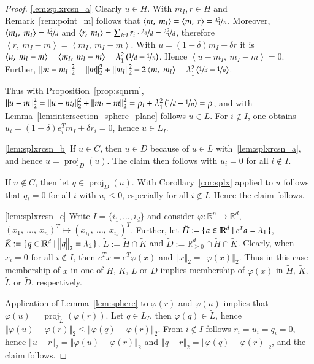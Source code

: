 \documentclass[twoside,11pt]{article}
\DeclareMathOperator{\proj}{proj}
\newcommand{\R}{\mathbb{R}}
\newcommand{\0}{\mathcal{O}}
\newcommand{\transp}{^T}
\newcommand{\norm}[1]{\left\Vert#1\right\Vert}
\newcommand{\scp}[2]{\left<#1,\ #2\right>}
\newcommand{\discint}[2]{\{#1,\dotsc,#2\}}
\begin{document}
\begin{proof}
\ref{lem:splxrcsn_a}
Clearly $u\in H$.
With $m_I,r\in H$ and Remark~\ref{rem:point_m} follows that $\scp{m}{m_I} = \scp{m}{r} = \nicefrac{\lambda_1^2}{n}$.
Moreover, $\scp{m_I}{m_I} = \nicefrac{\lambda_1^2}{d}$ and $\scp{r}{m_I} = \sum_{i\in I}r_i\cdot\nicefrac{\lambda_1}{d} = \nicefrac{\lambda_1^2}{d}$, therefore $\scp{r}{m_I - m} = \scp{m_I}{m_I - m}$.
With $u = \left(1 - \delta\right)m_I + \delta r$ it is $\scp{u}{m_I - m} = \scp{m_I}{m_I - m} = \lambda_1^2\left(\nicefrac{1}{d} - \nicefrac{1}{n}\right)$.
Hence $\scp{u - m_I}{m_I - m} = 0$.
Further, $\norm{m - m_I}_2^2 = \norm{m}_2^2 + \norm{m_I}_2^2 - 2\scp{m}{m_I} = \lambda_1^2\left(\nicefrac{1}{d} - \nicefrac{1}{n}\right)$.

Thus with Proposition~\ref{prop:sqnrm}, $\norm{u - m}_2^2 = \norm{u - m_I}_2^2 + \norm{m_I - m}_2^2 = \rho_I + \lambda_1^2\left(\nicefrac{1}{d} - \nicefrac{1}{n}\right) = \rho$, and with Lemma~\ref{lem:intersection_sphere_plane} follows $u\in L$.
For $i\not\in I$, one obtains $u_i = \left(1 - \delta\right)e_i\transp m_I + \delta r_i = 0$, hence $u\in L_I$.

\ref{lem:splxrcsn_b}
If $u\in C$, then $u\in D$ because of $u\in L$ with~\ref{lem:splxrcsn_a}, and hence $u = \proj_D(u)$.
The claim then follows with $u_i = 0$ for all $i\not\in I$.

If $u\not\in C$, then let $q\in\proj_D(u)$.
With Corollary~\ref{cor:splx} applied to $u$ follows that $q_i = 0$ for all $i$ with $u_i \leq 0$, especially for all $i\not\in I$.
Hence the claim follows.

\ref{lem:splxrcsn_c}
Write $I = \discint{i_1}{i_d}$ and consider $\varphi\colon\R^n\to\R^d$, $\left(x_1,\ \dotsc,\ x_n\right)\transp\mapsto\left(x_{i_1},\ \dotsc,\ x_{i_d}\right)\transp$.
Further, let $\tilde{H} := \set{a\in\R^d | e\transp a = \lambda_1}$, $\tilde{K} := \set{q\in\R^d | \norm{q}_2 = \lambda_2}$, $\tilde{L} := \tilde{H}\cap \tilde{K}$ and $\tilde{D} := \R_{\geq 0}^d \cap \tilde{H} \cap \tilde{K}$.
Clearly, when $x_i = 0$ for all $i\not\in I$, then $e\transp x = e\transp\varphi(x)$ and $\norm{x}_2 = \norm{\varphi(x)}_2$.
Thus in this case membership of $x$ in one of $H$, $K$, $L$ or $D$ implies membership of $\varphi(x)$ in $\tilde{H}$, $\tilde{K}$, $\tilde{L}$ or $\tilde{D}$, respectively.

Application of Lemma~\ref{lem:sphere} to $\varphi(r)$ and $\varphi(u)$ implies that $\varphi(u) = \proj_{\tilde{L}}(\varphi(r))$.
Let $q\in L_I$, then $\varphi(q)\in\tilde{L}$, hence $\norm{\varphi(u) - \varphi(r)}_2 \leq \norm{\varphi(q) - \varphi(r)}_2$.
From $i\not\in I$ follows $r_i = u_i = q_i = 0$, hence $\norm{u - r}_2 = \norm{\varphi(u) - \varphi(r)}_2$ and $\norm{q - r}_2 = \norm{\varphi(q) - \varphi(r)}_2$, and the claim follows.


\end{proof}
\end{document}
